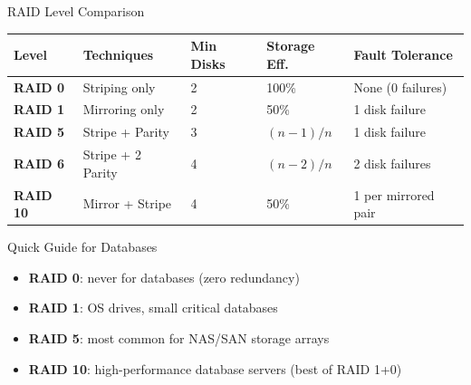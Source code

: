 \begin{frame}{RAID Level Comparison}
  \begin{center}
  \renewcommand{\arraystretch}{1.3}
  \small
  \begin{tabular}{@{}lllll@{}}
    \toprule
    \textbf{Level} & \textbf{Techniques} & \textbf{Min Disks} & \textbf{Storage Eff.} & \textbf{Fault Tolerance} \\
    \midrule
    \textbf{RAID 0} & Striping only     & 2 & 100\% & None (0 failures) \\
    \textbf{RAID 1} & Mirroring only    & 2 & 50\%  & 1 disk failure \\
    \textbf{RAID 5} & Stripe + Parity   & 3 & $(n-1)/n$ & 1 disk failure \\
    \textbf{RAID 6} & Stripe + 2 Parity & 4 & $(n-2)/n$ & 2 disk failures \\
    \textbf{RAID 10}& Mirror + Stripe   & 4 & 50\%  & 1 per mirrored pair \\
    \bottomrule
  \end{tabular}
  \end{center}

  \begin{block}{Quick Guide for Databases}
    \begin{itemize}
      \item \textbf{RAID 0}: never for databases (zero redundancy)
      \item \textbf{RAID 1}: OS drives, small critical databases
      \item \textbf{RAID 5}: most common for NAS/SAN storage arrays
      \item \textbf{RAID 10}: high-performance database servers (best of RAID 1+0)
    \end{itemize}
  \end{block}
\end{frame}

